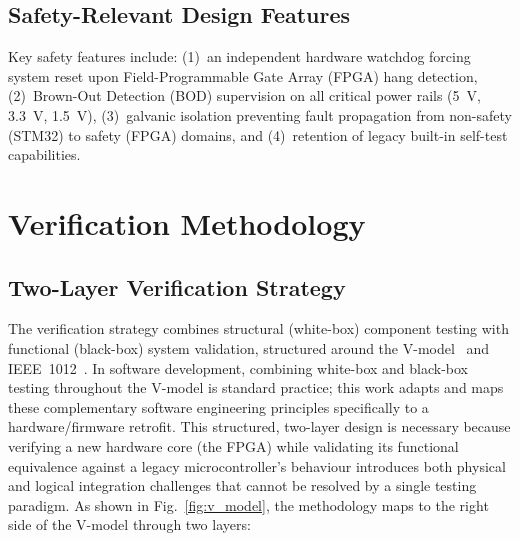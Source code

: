 \documentclass[journal, a4paper]{IEEEtran}
\newif\iffirstFPGA  \firstFPGAtrue
\newcommand{\FPGA}{\iffirstFPGA Field-Programmable Gate Array (FPGA)\global\firstFPGAfalse\else FPGA\fi}
\newif\iffirstBOD   \firstBODtrue
\newcommand{\BOD}{\iffirstBOD Brown-Out Detection (BOD)\global\firstBODfalse\else BOD\fi}
\begin{document}
\subsection{Safety-Relevant Design Features}
Key safety features include: (1)~an independent hardware watchdog forcing system reset upon \FPGA{} hang detection, (2)~\BOD{} supervision on all critical power rails (\SI{5}{\volt}, \SI{3.3}{\volt}, \SI{1.5}{\volt}), (3)~galvanic isolation preventing fault propagation from non-safety (STM32) to safety (\FPGA{}) domains, and (4)~retention of legacy built-in self-test capabilities.

\section{Verification Methodology}
\label{sec:methodology}

\subsection{Two-Layer Verification Strategy}
The verification strategy combines structural (white-box) component testing with functional (black-box) system validation, structured around the V-model~\cite{iec61508_2010,en50716_2023} and IEEE~1012~\cite{ieee1012_2024}. In software development, combining white-box and black-box testing throughout the V-model is standard practice; this work adapts and maps these complementary software engineering principles specifically to a hardware/firmware retrofit. This structured, two-layer design is necessary because verifying a new hardware core (the \FPGA{}) while validating its functional equivalence against a legacy microcontroller's behaviour introduces both physical and logical integration challenges that cannot be resolved by a single testing paradigm. As shown in Fig.~\ref{fig:v_model}, the methodology maps to the right side of the V-model through two layers:
\end{document}
